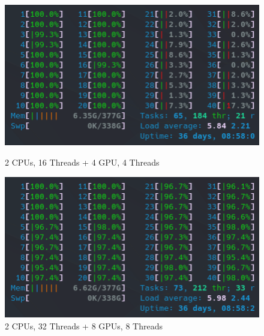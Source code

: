 \begin{figure}[!h]
    \centering
    \captionsetup{width=.48\linewidth}
    \begin{minipage}[t]{0.48\textwidth}
        \includegraphics[width=\textwidth]{figures/configurations/OMP/htop_hybrid/2CPUs_16Threads___4GPUs_4Threads.png}
        \caption{2 CPUs, 16 Threads + 4 GPU, 4 Threads}\label{fig:2CPUs_16Threads___4GPUs_4Threads}
    \end{minipage}
    \hspace{0.4cm}
    \centering
    \captionsetup{width=.48\linewidth}
    \begin{minipage}[t]{0.48\textwidth}
        \includegraphics[width=\textwidth]{figures/configurations/OMP/htop_hybrid/2CPU_32Threads___8GPUs_8Threads.png}
        \caption{2 CPUs, 32 Threads + 8 GPUs, 8 Threads}\label{fig:2CPU_32Threads___8GPUs_8Threads}
    \end{minipage}
\end{figure}


